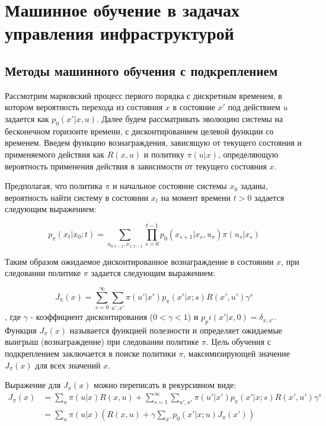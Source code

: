 \section{Машинное обучение в задачах управления инфраструктурой}

\subsection{Методы машинного обучения с подкреплением}

Рассмотрим марковский процесс первого порядка с дискретным временем, в котором  вероятность перехода из состояния $x$ в состояние $x'$ под действием $u$ задается как $p_0(x'|x,u)$.  Далее будем рассматривать эволюцию системы на бесконечном горизонте времени, с дисконтированием целевой функции со временем. Введем функцию вознаграждения, зависящую от текущего состояния и применяемого действия  как $R(x,u)$ и политику $\pi(u|x)$, определяющую вероятность применения действия в зависимости от текущего состояния $x$.

Предполагая, что политика $\pi$ и начальное состояние системы $x_0$ заданы, вероятность найти систему в состоянии $x_t$ на момент времени $t > 0$ задается следующим выражением:

\begin{equation}
    \label{eq:pxxt}
     p_\pi(x_t|x_0; t) = 
     \sum_{u_{0:t−1}, x_{1:t−1}}{
     	\prod_{s=0}^{t-1} {
        	p_0(x_{s+1}|x_s, u_x) \pi(u_s|x_s)
         }
      }
\end{equation}

Таким образом ожидаемое дисконтированное вознаграждение в состоянии $x$, при следовании политике $\pi$ задается следующим выражением:

\begin{equation}
    \label{eq:j_pi}
     J_{\pi}(x) = 
     \sum_{s=0}^{\infty}
       \sum_{u', x'}{
          \pi(u'|x')p_\pi(x'|x; s)R(x', u')\gamma^s
        }
\end{equation}
, где $\gamma$ - коэффициент дисконтирования ($0 < \gamma < 1$) и $p_pi(x'|x, 0) = \delta_{x,x'}$. Функция $J_\pi(x)$ называется функцией полезности и определяет ожидаемые выигрыш (вознаграждение) при следовании политике $\pi$. Цель обучения с подкреплением заключается в поиске политики $\pi$, максимизирующей значение $J_\pi(x)$ для всех значений $x$.

Выражение для $J_\pi(x)$ можно переписать в рекурсивном виде:
\begin{equation}
    \label{eq:j_pi_rec}
    \begin{split}
     J_\pi(x) &= 
     \sum_u {\pi(u|x)R(x,u)} + 
     \sum_{s=1}^{\infty}
       \sum_{u', x'}{
          \pi(u'|x')p_\pi(x'|x; s)R(x', u')\gamma^s 
        } \\
        &= \sum_u {\pi(u|x)} \left( 
        R(x,u) + \gamma \sum_{x'}{
        		p_0(x'|x; u)J_{\pi}(x')
            }
       		\right)
            \end{split}
\end{equation}

